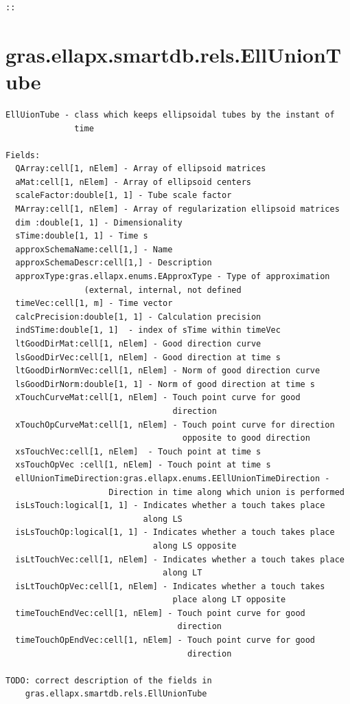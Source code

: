 \documentclass[letterpaper,10pt,english]{sphinxmanual}
\begin{document}
\begin{Verbatim}[commandchars=\\\{\}]
::
\end{Verbatim}


\section{gras.ellapx.smartdb.rels.EllUnionTube}
\label{chap_func:gras-ellapx-smartdb-rels-elluniontube}
\begin{Verbatim}[commandchars=\\\{\}]
EllUionTube - class which keeps ellipsoidal tubes by the instant of
              time

Fields:
  QArray:cell[1, nElem] - Array of ellipsoid matrices
  aMat:cell[1, nElem] - Array of ellipsoid centers
  scaleFactor:double[1, 1] - Tube scale factor
  MArray:cell[1, nElem] - Array of regularization ellipsoid matrices
  dim :double[1, 1] - Dimensionality
  sTime:double[1, 1] - Time s
  approxSchemaName:cell[1,] - Name
  approxSchemaDescr:cell[1,] - Description
  approxType:gras.ellapx.enums.EApproxType - Type of approximation
                (external, internal, not defined
  timeVec:cell[1, m] - Time vector
  calcPrecision:double[1, 1] - Calculation precision
  indSTime:double[1, 1]  - index of sTime within timeVec
  ltGoodDirMat:cell[1, nElem] - Good direction curve
  lsGoodDirVec:cell[1, nElem] - Good direction at time s
  ltGoodDirNormVec:cell[1, nElem] - Norm of good direction curve
  lsGoodDirNorm:double[1, 1] - Norm of good direction at time s
  xTouchCurveMat:cell[1, nElem] - Touch point curve for good
                                  direction
  xTouchOpCurveMat:cell[1, nElem] - Touch point curve for direction
                                    opposite to good direction
  xsTouchVec:cell[1, nElem]  - Touch point at time s
  xsTouchOpVec :cell[1, nElem] - Touch point at time s
  ellUnionTimeDirection:gras.ellapx.enums.EEllUnionTimeDirection -
                     Direction in time along which union is performed
  isLsTouch:logical[1, 1] - Indicates whether a touch takes place
                            along LS
  isLsTouchOp:logical[1, 1] - Indicates whether a touch takes place
                              along LS opposite
  isLtTouchVec:cell[1, nElem] - Indicates whether a touch takes place
                                along LT
  isLtTouchOpVec:cell[1, nElem] - Indicates whether a touch takes
                                  place along LT opposite
  timeTouchEndVec:cell[1, nElem] - Touch point curve for good
                                   direction
  timeTouchOpEndVec:cell[1, nElem] - Touch point curve for good
                                     direction

TODO: correct description of the fields in
    gras.ellapx.smartdb.rels.EllUnionTube
\end{Verbatim}
\end{document}
